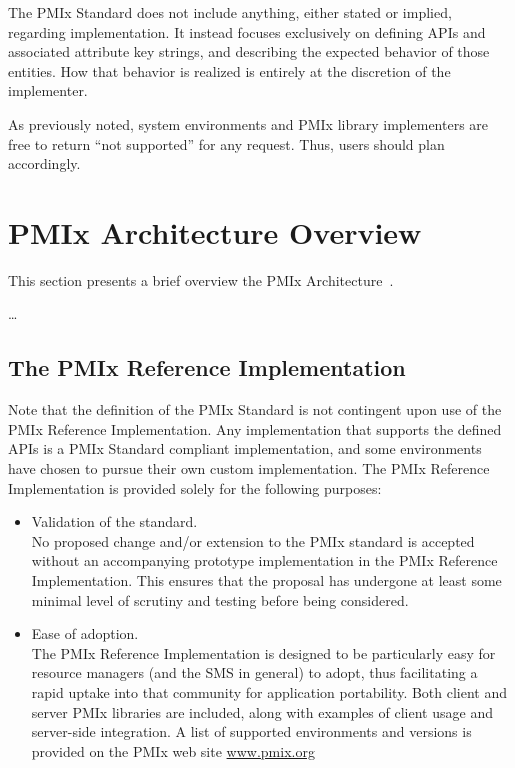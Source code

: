 The \ac{PMIx} Standard does not include anything, either stated or implied, regarding implementation.
It instead focuses exclusively on defining APIs and associated attribute key strings, and describing the expected behavior of those entities.
How that behavior is realized is entirely at the discretion of the implementer.

As previously noted, system environments and \ac{PMIx} library implementers are free to return ``not supported'' for any request. Thus, users should plan accordingly.


\section{PMIx Architecture Overview}
\label{chap:intro:arch_overview}

This section presents a brief overview the \ac{PMIx} Architecture~\cite{2017-Castain-EuroMPI}.

\ldots

\subsection{The PMIx Reference Implementation}

Note that the definition of the \ac{PMIx} Standard is not contingent upon use of the \ac{PMIx} Reference Implementation.
Any implementation that supports the defined APIs is a \ac{PMIx} Standard compliant implementation, and some environments have chosen to pursue their own custom implementation.
The \ac{PMIx} Reference Implementation is provided solely for the following purposes:
\begin{itemize}
\item Validation of the standard.\\
No proposed change and/or extension to the \ac{PMIx} standard is accepted without an accompanying prototype implementation in the \ac{PMIx} Reference Implementation.
This ensures that the proposal has undergone at least some minimal level of scrutiny and testing before being considered.
\item Ease of adoption.\\
The \ac{PMIx} Reference Implementation is designed to be particularly easy for resource managers (and the \ac{SMS} in general) to adopt, thus facilitating a rapid uptake into that community for application portability.
Both client and server \ac{PMIx} libraries are included, along with examples of client usage and server-side integration.
A list of supported environments and versions is provided on the \ac{PMIx} web site \url{www.pmix.org}
\end{itemize}

